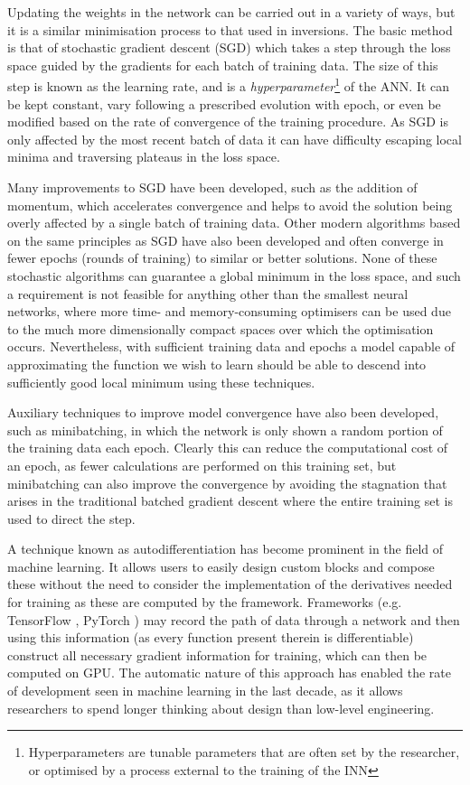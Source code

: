 Updating the weights in the network can be carried out in a variety of ways, but it is a similar minimisation process to that used in inversions.
The basic method is that of stochastic gradient descent (SGD) which takes a step through the loss space guided by the gradients for each batch of training data.
The size of this step is known as the learning rate, and is a \emph{hyperparameter}\footnote{Hyperparameters are tunable parameters that are often set by the researcher, or optimised by a process external to the training of the INN} of the ANN.
It can be kept constant, vary following a prescribed evolution with epoch, or even be modified based on the rate of convergence of the training procedure.
As SGD is only affected by the most recent batch of data it can have difficulty escaping local minima and traversing plateaus in the loss space.

Many improvements to SGD have been developed, such as the addition of momentum, which accelerates convergence and helps to avoid the solution being overly affected by a single batch of training data.
Other modern algorithms based on the same principles as SGD have also been developed \citep[e.g. the Adam algorithm,][]{2014Kingma} and often converge in fewer epochs (rounds of training) to similar or better solutions.
None of these stochastic algorithms can guarantee a global minimum in the loss space, and such a requirement is not feasible for anything other than the smallest neural networks, where more time- and memory-consuming optimisers can be used due to the much more dimensionally compact spaces over which the optimisation occurs.
Nevertheless, with sufficient training data and epochs a model capable of approximating the function we wish to learn should be able to descend into sufficiently good local minimum using these techniques.

Auxiliary techniques to improve model convergence have also been developed, such as minibatching, in which the network is only shown a random portion of the training data each epoch.
Clearly this can reduce the computational cost of an epoch, as fewer calculations are performed on this training set, but minibatching can also improve the convergence by avoiding the stagnation that arises in the traditional batched gradient descent where the entire training set is used to direct the step.

A technique known as autodifferentiation has become prominent in the field of machine learning.
It allows users to easily design custom blocks and compose these without the need to consider the implementation of the derivatives needed for training as these are computed by the framework.
Frameworks (e.g. TensorFlow \citep{Abadi2016}, PyTorch \citep{PyTorch}) may record the path of data through a network and then using this information (as every function present therein is differentiable) construct all necessary gradient information for training, which can then be computed on GPU.
The automatic nature of this approach has enabled the rate of development seen in machine learning in the last decade, as it allows researchers to spend longer thinking about design than low-level engineering.

